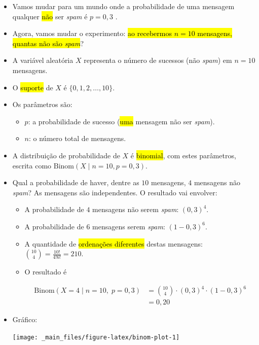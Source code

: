 \documentclass[
  11pt]{report}
\begin{document}
\begin{itemize}
\item
  Vamos mudar para um mundo onde a probabilidade de uma mensagem qualquer {\hl{não}} ser \emph{spam} é $p = 0{,}3$ .
\item
  Agora, vamos mudar o experimento: {\hl{ao recebermos $n = 10$ mensagens, quantas não são \emph{spam}}}?
\item
  A variável aleatória $X$ representa o número de sucessos (não \emph{spam}) em $n = 10$ mensagens.
\item
  O {\hl{suporte}} de $X$ é $\{ 0, 1, 2, \ldots, 10 \}$.
\item
  Os parâmetros são:

  \begin{itemize}
  \item
    $p$: a probabilidade de sucesso ({\hl{uma}} mensagem não ser \emph{spam}).
  \item
    $n$: o número total de mensagens.
  \end{itemize}
\item
  A distribuição de probabilidade de $X$ é {\hl{binomial}}, com estes parâmetros, escrita como $\text{Binom}(X \mid n = 10, p = 0{,}3)$.
\item
  Qual a probabilidade de haver, dentre as $10$ mensagens, $4$ mensagens não \emph{spam}? As mensagens são independentes. O resultado vai envolver:

  \begin{itemize}
  \item
    A probabilidade de $4$ mensagens não serem \emph{spam}: $(0{,}3)^4$.
  \item
    A probabilidade de $6$ mensagens serem \emph{spam}: $(1 - 0{,}3)^6$.
  \item
    A quantidade de {\hl{ordenações diferentes}} destas mensagens: ${10 \choose 4} = \frac{10!}{4!6!} = 210$.
  \item
    O resultado é

    \[
    \begin{aligned}
    \text{Binom}(X = 4 \mid n = 10,\; p = 0{,}3) 
      &= {10 \choose 4} \cdot (0{,}3)^4 \cdot (1 - 0{,}3)^6 \\
      &= 0{,}20
    \end{aligned}
    \]
  \end{itemize}
\item
  Gráfico:

  \begin{center}\texttt{[image: \_main\_files/figure-latex/binom-plot-1]} \end{center}
\end{itemize}
\end{document}
